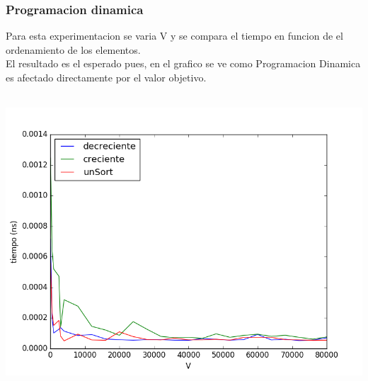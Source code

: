 \subsubsection{Programacion dinamica}
Para esta experimentacion se varia V y se compara el tiempo en funcion de el ordenamiento de los elementos.\\
El resultado es el esperado pues, en el grafico se ve como Programacion Dinamica es afectado directamente por el valor objetivo.
\begin{center}
\includegraphics[width=16cm, height=11cm]{pdSuma.png}
\end{center}
